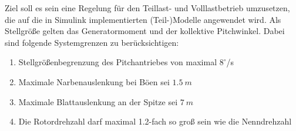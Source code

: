 Ziel soll es sein eine Regelung für den Teillast- und Volllastbetrieb umzusetzen, die auf die in Simulink implementierten (Teil-)Modelle angewendet wird. Als Stellgröße gelten das Generatormoment und der kollektive Pitchwinkel. Dabei sind folgende Systemgrenzen zu berücksichtigen:

\begin{enumerate}
    \item Stellgrößenbegrenzung des Pitchantriebes von maximal $8^\circ$/s
    \item Maximale Narbenauslenkung bei Böen sei $\SI{1.5}{m}$
    \item Maximale Blattauslenkung an der Spitze sei $\SI{7}{m}$
    \item Die Rotordrehzahl darf maximal 1.2-fach so groß sein wie die Nenndrehzahl
\end{enumerate}